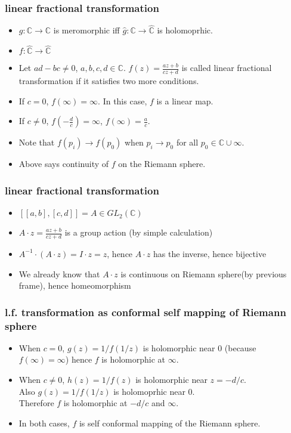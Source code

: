 \documentclass{beamer}
\begin{document}
\begin{frame}
	\frametitle{linear fractional transformation}
	\begin{itemize}
		\item $g : \mathbb{C} \rightarrow \mathbb{C}$ is meromorphic iff $\hat{g} : \mathbb{C} \rightarrow \hat{\mathbb{C}}$ is holomoprhic.
		\item $f: \hat{\mathbb{C}} \rightarrow \hat{\mathbb{C}}$
		\item Let $ad-bc \ne 0$, $a, b, c, d \in \mathbb{C}$. $f(z) = \frac{az + b}{cz+d}$ is called linear fractional transformation if it satisfies two more conditions.
		\item If $c=0$, $f(\infty) = \infty$. In this case, $f$ is a linear map.
		\item If $c\ne 0$, $f(-\frac{d}{c})= \infty$, $f(\infty) = \frac{a}{c}$.
		\item Note that $f(p_i) \rightarrow f(p_0)$ when $p_i \rightarrow p_0$ for all $p_0 \in \mathbb{C} \cup \infty$.
		\item Above says continuity of $f$ on the Riemann sphere.
	\end{itemize}
\end{frame}

\begin{frame}
	\frametitle{linear fractional transformation}
	\begin{itemize}
		\item $[ [a, b], [c, d] ] = A \in GL_2(\mathbb{C})$

		\item $A \cdot z = \frac{az+b}{cz+d}$ is a group action (by simple calculation)

		\item $A^{-1} \cdot (A \cdot z ) = I \cdot z = z$, hence $A \cdot z$ has the inverse, hence bijective

		\item We already know that $A \cdot z$ is continuous on Riemann sphere(by previous frame), hence homeomorphism
	\end{itemize}
\end{frame}

\begin{frame}
	\frametitle{l.f. transformation as conformal self mapping of Riemann sphere}
	\begin{itemize}
		\item When $c = 0$, $g(z) = 1/f(1/z)$ is holomorphic near $0$ (because $f(\infty) = \infty$) hence $f$ is holomorphic at $\infty$.
			
		\item When $c \ne 0$, $h(z) = 1/f(z)$ is holomorphic near $z = -d/c$. \\
			Also $g(z) = 1/f(1/z)$ is holomoprhic near $0$.\\
			Therefore $f$ is holomorphic at $-d/c$ and $\infty$.

		\item In both cases, $f$ is self conformal mapping of the Riemann sphere.
	\end{itemize}
\end{frame}
\end{document}
